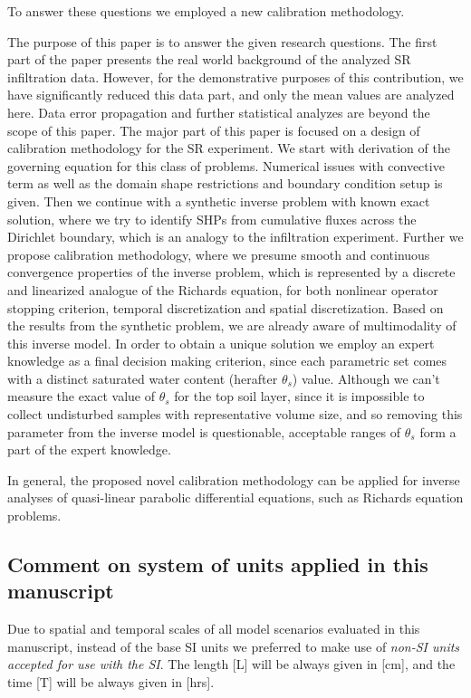 \documentclass[review,times,3p,10pt]{elsarticle}
\begin{document}
To answer these questions we employed a new calibration methodology.

 {The purpose of this paper is to answer the given research questions. The first part of the paper presents the real world background of the analyzed SR infiltration data. However, for the demonstrative purposes of this contribution, we have significantly reduced this data part, and only the mean values are analyzed here. Data error propagation and further statistical analyzes are beyond the scope of this paper. The major part of this paper is focused on a design of calibration methodology for the SR experiment. We start with derivation of the governing equation for this class of problems. Numerical issues with convective term as well as the domain shape restrictions and boundary condition setup is given. Then we continue with a synthetic inverse problem with known exact solution, where we try to identify SHPs from cumulative fluxes across the Dirichlet boundary, which is an analogy to the infiltration experiment.  Further we propose calibration methodology, where we presume smooth and continuous convergence properties of the inverse problem, which is represented by a discrete and linearized analogue of the Richards equation, for both nonlinear operator stopping criterion, temporal discretization and spatial discretization. Based on the results from the synthetic problem, we are already aware of multimodality of this inverse model. In order to obtain a unique solution we employ an expert knowledge as a final decision making criterion, since each parametric set comes with a distinct saturated water content (herafter $\theta_s$) value. Although we can't measure the exact value of $\theta_s$ for the top soil layer, since it is impossible to collect undisturbed samples with representative volume size, and so removing this parameter from the inverse model is questionable, acceptable ranges of $\theta_s$ form a part of the expert knowledge. 
 
 In general, the proposed novel calibration methodology can be applied  for inverse analyses of quasi-linear parabolic differential equations, such as Richards equation problems.
 }




\subsection{Comment on system of units applied in this manuscript}

Due to spatial and temporal scales of all model scenarios evaluated in this manuscript, instead of the base SI units we preferred to make use of {\it non-SI units  accepted for use with the SI}. The length [L] will be always given in [cm], and the time [T] will be always given in [hrs].
\end{document}
